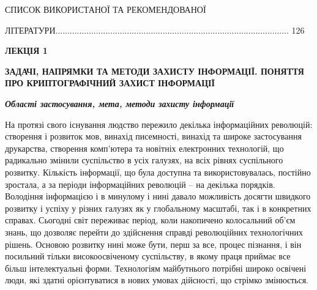 \documentclass[a4paper]{article}
\newcounter{}
\begin{document}
\bigskip


\bigskip

СПИСОК  ВИКОРИСТАНОЇ  ТА  РЕКОМЕНДОВАНОЇ

ЛІТЕРАТУРИ..................................................................................................
126


\bigskip


\bigskip


\bigskip


\bigskip


\bigskip


\bigskip


\bigskip


\bigskip


\bigskip


\bigskip


\bigskip


\bigskip


\bigskip


\bigskip


\bigskip


\bigskip

{\bfseries
ЛЕКЦІЯ  1}


\bigskip

{\centering\bfseries
ЗАДАЧІ,  НАПРЯМКИ  ТА  МЕТОДИ  ЗАХИСТУ  ІНФОРМАЦІЇ.  ПОНЯТТЯ  ПРО 
КРИПТОГРАФІЧНИЙ ЗАХИСТ  ІНФОРМАЦІЇ
\par}


\bigskip


\bigskip

{\bfseries\itshape
Області застосування, мета, методи захисту інформації}


\bigskip


\bigskip

На протязі свого існування людство пережило декілька інформаційних революцій:
створення і розвиток мов, винахід писемності, винахід та широке застосування
друкарства, створення комп’ютера та новітніх електронних технологій, що
радикально змінили суспільство в усіх галузях, на всіх рівнях  суспільного
розвитку. Кількість інформації, що була доступна та використовувалась, постійно
зростала, а за періоди інформаційних революцій – на декілька порядків.
Володіння інформацією і в минулому і нині давало можливість досягти швидкого
розвитку і успіху у різних галузях як у глобальному масштабі, так і в
конкретних справах. Сьогодні світ переживає період, коли накопичено колосальний
об’єм знань, що  дозволяє перейти до здійснення справді революційних
технологічних рішень. Основою розвитку  нині може бути, перш за все, процес
пізнання, і він посильний тільки високоосвіченому суспільству, в якому праця
приймає все більш інтелектуальні форми. Технологіям майбутнього потрібні широко
освічені люди, які здатні орієнтуватися в нових умовах дійсності, що стрімко
змінюється.
\end{document}
